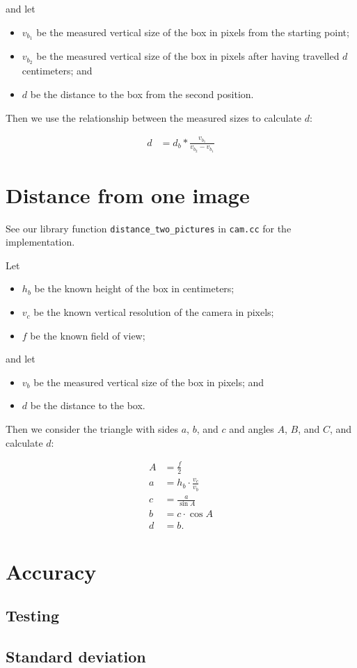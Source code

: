\documentclass[a4paper,12pt]{article}
\begin{document}
and let

\begin{itemize}
\item $v_{b_1}$ be the measured vertical size of the box in pixels from the
starting point;
\item $v_{b_2}$ be the measured vertical size of the box in pixels after having
travelled $d$ centimeters; and
\item $d$ be the distance to the box from the second position.
\end{itemize}

Then we use the relationship between the measured sizes to calculate $d$:

\begin{align*}
  d &= d_b * \frac{v_{b_1}}{v_{b_2} - v_{b_1}}
\end{align*}


\section{Distance from one image}

See our library function \texttt{distance_two_pictures} in \texttt{cam.cc} for
the implementation.

Let
\begin{itemize}
\item $h_b$ be the known height of the box in centimeters;
\item $v_c$ be the known vertical resolution of the camera in pixels;
\item $f$ be the known field of view;
\end{itemize}

and let
\begin{itemize}
\item $v_b$ be the measured vertical size of the box in pixels; and
\item $d$ be the distance to the box.
\end{itemize}

Then we consider the triangle with sides $a$, $b$, and $c$ and angles $A$, $B$,
and $C$, and calculate $d$:

\begin{align*}
  A &= \frac{f}{2}\\
  a &= h_b \cdot \frac{v_c}{v_b}\\
  c &= \frac{a}{\sin A}\\
  b &= c \cdot \cos A\\
  d &= b.
\end{align*}


\section{Accuracy}

\subsection{Testing}

\subsection{Standard deviation}
\end{document}
